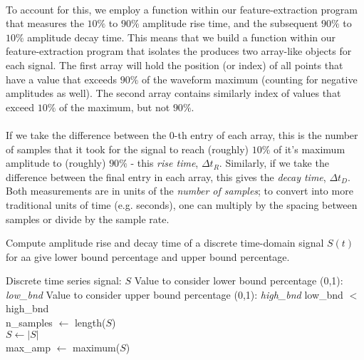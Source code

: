 \documentclass[12pt,letterpaper]{article}
\begin{document}
\paragraph*{}To account for this, we employ a function within our feature-extraction program that measures the $10\%$ to $90\%$ amplitude rise time, and the subsequent $90\%$ to $10\%$ amplitude decay time. This means that we build a function within our feature-extraction program that isolates the produces two array-like objects for each signal. The first array will hold the position (or index) of all points that have a value that exceeds $90\%$ of the waveform maximum (counting for negative amplitudes as well). The second array contains similarly index of values that exceed $10\%$ of the maximum, but not $90\%$.

\paragraph*{}If we take the difference between the $0$-th entry of each array, this is the number of samples that it took for the signal to reach (roughly) $10\%$ of it's maximum amplitude to (roughly) $90\%$ - this \textit{rise time}, $\Delta t_{R}$. Similarly, if we take the difference between the final entry in each array, this gives the \textit{decay time}, $\Delta t_{D}$. Both measurements are in units of the \textit{number of samples}; to convert into more traditional units of time (e.g. seconds), one can multiply by the spacing between samples or divide by the sample rate.


\begin{algorithm}
\label{Rise-Decay Time}
\caption{Compute amplitude rise and decay time of a discrete time-domain signal $S(t)$ for aa give lower bound percentage and upper bound percentage.}

\begin{algorithmic}

\REQUIRE Discrete time series signal: $S$ 
\REQUIRE Value to consider lower bound percentage (0,1): \textit{low\_bnd}
\REQUIRE Value to consider upper bound percentage (0,1): \textit{high\_bnd}
\ENSURE low\_bnd $<$ high\_bnd \\

n\_samples $\leftarrow$ length($S$) \\
$S \leftarrow |S|$ \\
max\_amp $\leftarrow$ maximum($S$) \\


\end{algorithmic}
\end{algorithm}
\end{document}
